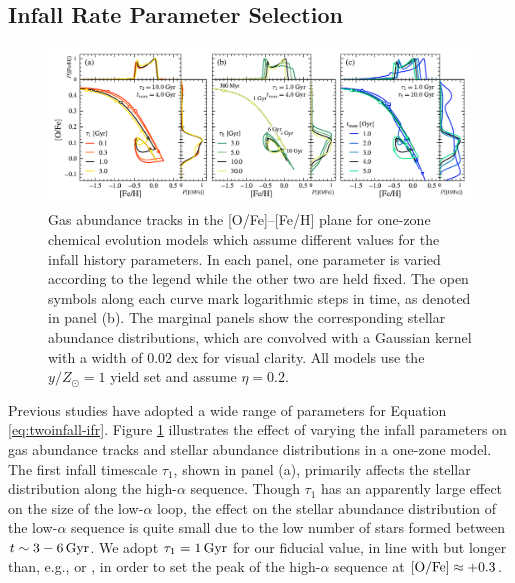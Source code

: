\documentclass[twocolumn,twocolappendix,linenumbers]{aastex631}
\newcommand{\mathOFe}{{\rm [O/Fe]}}
\newcommand{\yZ}[1]{$y/Z_\odot=#1$}
\begin{document}
\subsection{Infall Rate Parameter Selection}
\label{sec:parameter-selection}

\begin{figure}
    \centering
    \includegraphics[width=\textwidth]{figures/onezone_params.pdf}
    \caption{Gas abundance tracks in the [O/Fe]--[Fe/H] plane for one-zone chemical evolution models which assume different values for the infall history parameters. In each panel, one parameter is varied according to the legend while the other two are held fixed. The open symbols along each curve mark logarithmic steps in time, as denoted in panel (b). The marginal panels show the corresponding stellar abundance distributions, which are convolved with a Gaussian kernel with a width of 0.02 dex for visual clarity. All models use the \yZ{1} yield set and assume $\eta=0.2$.}
    \label{fig:twoinfall-parameters}
\end{figure}

Previous studies have adopted a wide range of parameters for Equation \ref{eq:twoinfall-ifr}. Figure \ref{fig:twoinfall-parameters} illustrates the effect of varying the infall parameters on gas abundance tracks and stellar abundance distributions in a one-zone model. The first infall timescale $\tau_1$, shown in panel (a), primarily affects the stellar distribution along the high-$\alpha$ sequence. Though $\tau_1$ has an apparently large effect on the size of the low-$\alpha$ loop, the effect on the stellar abundance distribution of the low-$\alpha$ sequence is quite small due to the low number of stars formed between $t\sim3-6\,{\rm Gyr}$. We adopt $\tau_1=1\,{\rm Gyr}$ for our fiducial value, in line with \citet{spitoni_galactic_2020} but longer than, e.g., \citet{nissen_high-precision_2020} or \citet{spitoni_apogee_2021}, in order to set the peak of the high-$\alpha$ sequence at $\mathOFe\approx+0.3$. 
\end{document}
